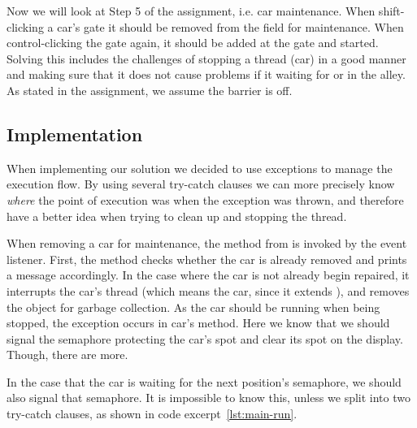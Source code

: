 
Now we will look at Step 5 of the assignment, i.e. car maintenance. When shift-clicking a car's gate it should be removed from the field for
maintenance. When control-clicking the gate again, it should be
added at the gate and started. Solving this includes the challenges of
stopping a thread (car) in a good manner and making sure that it
does not cause problems if it waiting for or in the alley. As stated
in the assignment, we assume the barrier is off.


\subsection{Implementation}
\label{sub:main-moni}
When implementing our solution we decided to use exceptions to manage
the execution flow. By using several try-catch clauses we can more
precisely know \emph{where} the point of execution was when the
exception was thrown, and therefore have a better idea when trying to
clean up and stopping the thread.

When removing a car for maintenance, the  method
from  is invoked by the event listener. First, the
method checks whether the car is already removed and prints a message
accordingly. In the case where the car is not already begin repaired,
it interrupts the car's thread (which means the car, since it extends
), and removes the object for garbage
collection. As the car should be running when being stopped, the
exception occurs in car's  method. Here we know that we
should signal the semaphore protecting the car's spot and clear its
spot on the display. Though, there are more.

In the case that the car is waiting for the next position's semaphore,
we should also signal that semaphore. It is impossible to know this,
unless we split into two try-catch clauses, as shown in code
excerpt~\ref{lst:main-run}.


